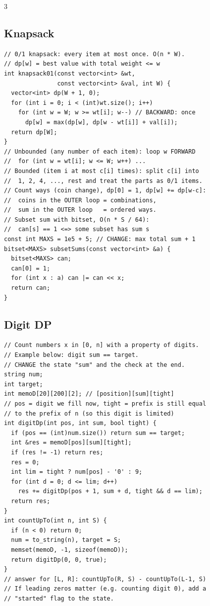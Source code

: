 \documentclass[8pt, a4paper]{article}
\begin{document}
\begin{multicols*}{3}
\subsection{Knapsack}
\begin{lstlisting}
// 0/1 knapsack: every item at most once. O(n * W).
// dp[w] = best value with total weight <= w
int knapsack01(const vector<int> &wt,
               const vector<int> &val, int W) {
  vector<int> dp(W + 1, 0);
  for (int i = 0; i < (int)wt.size(); i++)
    for (int w = W; w >= wt[i]; w--) // BACKWARD: once
      dp[w] = max(dp[w], dp[w - wt[i]] + val[i]);
  return dp[W];
}
// Unbounded (any number of each item): loop w FORWARD
//  for (int w = wt[i]; w <= W; w++) ...
// Bounded (item i at most c[i] times): split c[i] into
//  1, 2, 4, ..., rest and treat the parts as 0/1 items.
// Count ways (coin change), dp[0] = 1, dp[w] += dp[w-c]:
//  coins in the OUTER loop = combinations,
//  sum in the OUTER loop   = ordered ways.
// Subset sum with bitset, O(n * S / 64):
//  can[s] == 1 <=> some subset has sum s
const int MAXS = 1e5 + 5; // CHANGE: max total sum + 1
bitset<MAXS> subsetSums(const vector<int> &a) {
  bitset<MAXS> can;
  can[0] = 1;
  for (int x : a) can |= can << x;
  return can;
}
\end{lstlisting}
\subsection{Digit DP}
\begin{lstlisting}
// Count numbers x in [0, n] with a property of digits.
// Example below: digit sum == target.
// CHANGE the state "sum" and the check at the end.
string num;
int target;
int memoD[20][200][2]; // [position][sum][tight]
// pos = digit we fill now, tight = prefix is still equal
// to the prefix of n (so this digit is limited)
int digitDp(int pos, int sum, bool tight) {
  if (pos == (int)num.size()) return sum == target;
  int &res = memoD[pos][sum][tight];
  if (res != -1) return res;
  res = 0;
  int lim = tight ? num[pos] - '0' : 9;
  for (int d = 0; d <= lim; d++)
    res += digitDp(pos + 1, sum + d, tight && d == lim);
  return res;
}
int countUpTo(int n, int S) {
  if (n < 0) return 0;
  num = to_string(n), target = S;
  memset(memoD, -1, sizeof(memoD));
  return digitDp(0, 0, true);
}
// answer for [L, R]: countUpTo(R, S) - countUpTo(L-1, S)
// If leading zeros matter (e.g. counting digit 0), add a
// "started" flag to the state.
\end{lstlisting}

\end{multicols*}
\end{document}
